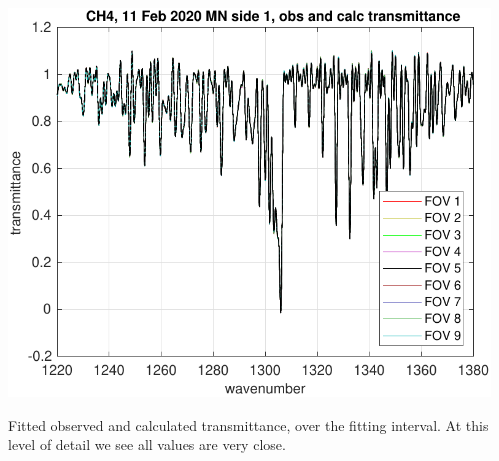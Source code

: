 \documentclass[9pt]{beamer}
\begin{document}
\begin{frame}
\begin{columns}[t]
\begin{column}{0.5\textwidth}
\end{column}
\begin{column}{0.5\textwidth}  
  \begin{centering}
  \includegraphics[width=\textwidth]{02-11_mn_s1_CH4/CH4_obs_and_calc.pdf}
  \end{centering}\vspace{3mm}

Fitted observed and calculated transmittance, over the fitting
interval.  At this level of detail we see all values are very close.

\end{column}
\end{columns}
\end{frame}
\end{document}
